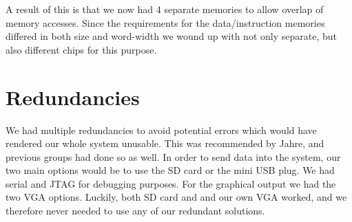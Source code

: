 A result of this is that we now had 4 separate memories to allow overlap of
memory accesses. Since the requirements for the data/instruction memories differed in both size and word-width 
we wound up with not only separate, but also different chips for this purpose.



\section{Redundancies}
We had multiple redundancies to avoid potential
errors which would have rendered our whole system unusable. This was recommended
by Jahre, and previous groups had done so as well. In order to send data into
the system, our two main options would be to use the \ac{SD} card or the mini
\ac{USB} plug. We had serial and \ac{JTAG} for debugging purposes. For the graphical
output we had the two \ac{VGA} options. Luckily, both \ac{SD} card and and our
own \ac{VGA} worked, and we therefore never needed to use any of our
redundant solutions.
